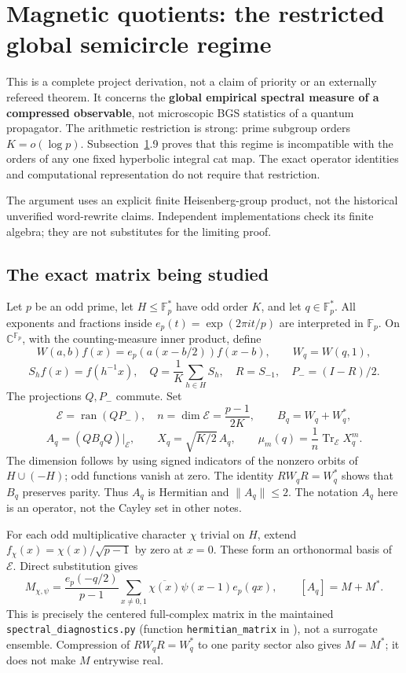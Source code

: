 \section{Magnetic quotients: the restricted global semicircle regime}\label{sec:magnetic}
This is a complete project derivation, not a claim of priority or an externally refereed theorem. It concerns the \textbf{global empirical spectral measure of a compressed observable}, not microscopic BGS statistics of a quantum propagator. The arithmetic restriction is strong: prime subgroup orders \(K=o(\log p)\). Subsection~\ref{sec:magnetic}.9 proves that this regime is incompatible with the orders of any one fixed hyperbolic integral cat map. The exact operator identities and computational representation do not require that restriction.

The argument uses an explicit finite Heisenberg-group product, not the historical unverified word-rewrite claims. Independent implementations check its finite algebra; they are not substitutes for the limiting proof.

\subsection{The exact matrix being studied}\label{magnetic:the-exact-matrix-being-studied}

Let \(p\) be an odd prime, let \(H\leq\mathbb F_p^*\) have odd order \(K\), and let \(q\in\mathbb F_p^*\). All exponents and fractions inside \(e_p(t)=\exp(2\pi i t/p)\) are interpreted in \(\mathbb F_p\). On \(\mathbb C^{\mathbb F_p}\), with the counting-measure inner product, define \[
 W(a,b)f(x)=e_p(a(x-b/2))f(x-b),\qquad W_q=W(q,1),
\] \[
 S_hf(x)=f(h^{-1}x),\quad Q=\frac1K\sum_{h\in H}S_h,\quad
 R=S_{-1},\quad P_-=(I-R)/2.
\] The projections \(Q,P_-\) commute. Set \[
 \mathcal E=\operatorname{ran}(QP_-),\quad n=\dim\mathcal E=\frac{p-1}{2K},
 \qquad B_q=W_q+W_q^*,
\] \[
 A_q=(QB_qQ)|_{\mathcal E},\qquad X_q=\sqrt{K/2}\,A_q,
 \qquad \mu_m(q)=\frac1n\operatorname{Tr}_{\mathcal E}X_q^m. \tag{MQ.1}
\] The dimension follows by using signed indicators of the nonzero orbits of \(H\cup(-H)\); odd functions vanish at zero. The identity \(RW_qR=W_q^*\) shows that \(B_q\) preserves parity. Thus \(A_q\) is Hermitian and \(\|A_q\|\leq2\). The notation \(A_q\) here is an operator, not the Cayley set in other notes.

For each odd multiplicative character \(\chi\) trivial on \(H\), extend \(f_\chi(x)=\chi(x)/\sqrt{p-1}\) by zero at \(x=0\). These form an orthonormal basis of \(\mathcal E\). Direct substitution gives \[
 M_{\chi,\psi}=\frac{e_p(-q/2)}{p-1}
   \sum_{x\ne0,1}\overline{\chi(x)}\psi(x-1)e_p(qx),
 \qquad [A_q]=M+M^*. \tag{MQ.2}
\] This is precisely the centered full-complex matrix in the maintained \texttt{spectral\_diagnostics.py} (function \texttt{hermitian\_matrix} in ), not a surrogate ensemble. Compression of \(RW_qR=W_q^*\) to one parity sector also gives \(M=M^*\); it does not make \(M\) entrywise real.

